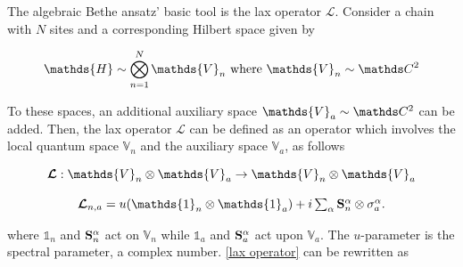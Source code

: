 \documentclass{homework}
\begin{document}
The algebraic Bethe ansatz' basic tool is the lax operator $\bm{\mathcal{L}}$. Consider a chain with $N$ sites and a corresponding Hilbert space given by 

\begin{equation}
    \mathds{H} \sim \bigotimes_{n=1}^{N} {\mathds{V}_n} \textnormal{ where } {\mathds{V}_n} \sim \ctwo
\end{equation}

To these spaces, an additional auxiliary space $\mathds{V}_a \sim \ctwo$ can be added. Then, the lax operator $\bm{\mathcal{L}}$ can be defined as an operator which involves the local quantum space $\mathds{V}_n$ and the auxiliary space $\mathds{V}_a$, as follows 

\begin{equation}
    \begin{array}{c}
         \bm{\mathcal{L}} : \mathds{V}_n \otimes \mathds{V}_a \rightarrow \mathds{V}_n \otimes \mathds{V}_a \\
         \\
         \bm{\mathcal{L}}_{n, a} = u(\mathds{1}_n \otimes \mathds{1}_a) + i \sum_{\alpha} \spin_n^\alpha \otimes \sigma_{a}^\alpha.
    \end{array}
    \label{lax operator}
\end{equation}


where $\mathds{1}_n$ and ${\bf S}_n^\alpha$ act on $\mathds{V}_n $ while $\mathds{1}_a$ and ${\bf S}_a^\alpha$ act upon $\mathds{V}_a$. The $u$-parameter is the spectral parameter, a complex number. \eqref{lax operator} can be rewritten as 
\end{document}
